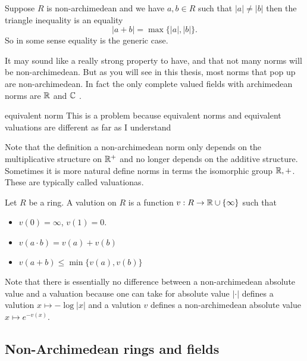\begin{remark}
	Suppose $R$ is non-archimedean and we have $a, b \in R$ such that $|a| \ne |b|$ then the triangle inequality is an equality \[
	|a + b| = \max \{|a|, |b|\} 
	.\] 
	So in some sense equality is the generic case. 
\end{remark}
It may sound like a really strong property to have, and that not many norms will be non-archimedean. 
But as you will see in this thesis, most norms that pop up are non-archimedean. 
In fact the only complete valued fields with archimedean norms are $\mathbb{R}$ and $\mathbb{C}$ .



\begin{definition}
	equivalent norm
	{\color{red} This is a problem because equivalent norms and equivalent valuations are different as far as I understand}
\end{definition}

Note that the definition a non-archimedean norm only depends on the multiplicative structure on $\mathbb{R}^{+}$ and no longer depends on the additive structure. 
Sometimes it is more natural define norms in terms the isomorphic group $\mathbb{R}, +$. 
These are typically called valuationas. 


\begin{definition}
	Let $R$ be a ring. A valution on $R$ is a function $v:R \to \mathbb{R} \cup \{\infty\} $ such that 	
	\begin{itemize}
		\item $v(0) = \infty$, $v(1) = 0$. 
		\item $v(a\cdot b) = v(a) + v(b)$
		\item $v(a + b) \le \min\{v(a), v(b)\}$
	\end{itemize}
\end{definition}

\begin{remark}
	Note that there is essentially no difference between a non-archimedean absolute value and a valuation because one can take for absolute value $|\cdot |$ defines a valution $x \mapsto -\log |x|$ and a valution $v$ defines a non-archimedean absolute value $x\mapsto e^{- v(x)}$. 
\end{remark}



\subsection{Non-Archimedean rings and fields} \label{sec:non-archimedean_rings_and_fields}


